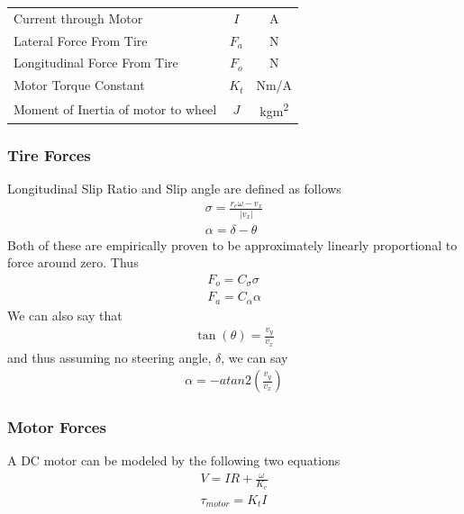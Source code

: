 \documentclass{article}
\begin{document}
\begin{center}
\begin{tabular}{l c c}
        Current through Motor                                                 & $I$        & A                      \\
        Lateral Force From Tire                                               & $F_a$      & N                      \\
        Longitudinal Force From Tire                                          & $F_o$      & N                      \\
        Motor Torque Constant                                                 & $K_t$      & Nm/A                   \\
        Moment of Inertia of motor to wheel                                   & $J$        & kgm\textsuperscript{2} \\
        \bottomrule
    \end{tabular}
\end{center}
\subsubsection{Tire Forces}
Longitudinal Slip Ratio and Slip angle are defined as follows
\begin{gather}
    \sigma  =  \frac{r_e\omega - v_x}{|v_x|} \\ %
    \alpha = \delta-\theta
\end{gather}
Both of these are empirically proven to be approximately linearly proportional to force around zero. \supercite{tire_basics} Thus
\begin{gather}
    F_o = C_\sigma \sigma \label{f_o}\\
    F_a = C_\alpha \alpha \label{f_a}
\end{gather}
We can also say that
\begin{gather}
    \tan(\theta) = \frac{v_y}{v_x}
\end{gather}
and thus assuming no steering angle, $\delta$, we can say
\begin{gather}
    \alpha = -atan2\left(\frac{v_y}{v_x}\right)
\end{gather}
\subsubsection{Motor Forces}
A DC motor can be modeled by the following two equations
\begin{gather}
    V = IR + \frac{\omega}{K_v}\\
    \tau_{motor} = K_tI \label{motor_torque}
\end{gather}
\end{document}
